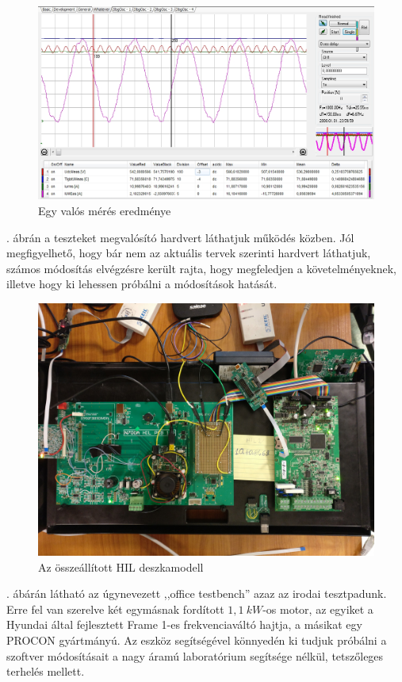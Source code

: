\begin{figure}[H]
	\centering
	\includegraphics[width = \textwidth]{figures/50Hz_400V_LD12A_10k.jpeg}
	\caption{Egy valós mérés eredménye} 
	\label{fig:meas_1}
\end{figure}

. ábrán a teszteket megvalósító hardvert láthatjuk működés közben. Jól megfigyelhető, hogy bár nem az aktuális tervek szerinti hardvert láthatjuk, számos módosítás elvégzésre került rajta, hogy megfeledjen a követelményeknek, illetve hogy ki lehessen próbálni a módosítások hatását.

\begin{figure}[H]
	\centering
	\includegraphics[width = \textwidth]{figures/hil_table.jpg}
	\caption{Az összeállított HIL deszkamodell} 
	\label{fig:hil_desk}
\end{figure}

. ábárán látható az úgynevezett ,,office testbench''
 azaz az irodai tesztpadunk. Erre fel van szerelve két egymásnak fordított $1,1\ kW$-os motor, az egyiket a Hyundai által fejlesztett Frame 1-es frekvenciaváltó hajtja, a másikat egy PROCON gyártmányú. Az eszköz segítségével könnyedén ki tudjuk próbálni a szoftver módosításait a nagy áramú laboratórium segítsége nélkül, tetszőleges terhelés mellett. 

